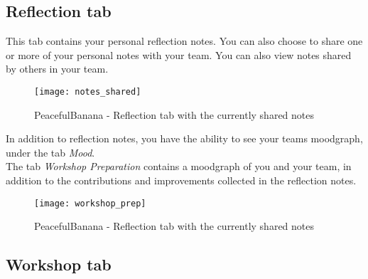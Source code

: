 \subsection{Reflection tab}
This tab contains your personal reflection notes. You can also choose to share one or more of your personal notes with your team. You can also view notes shared by others in your team. \\
\begin{figure}[h!]
\label{milestonessingular}
\centering
	\texttt{[image: notes\_shared]}
\caption{PeacefulBanana - Reflection tab with the currently shared notes}
\end{figure}
In addition to reflection notes, you have the ability to see your teams moodgraph, under the tab \textit{Mood}. \\
The tab \textit{Workshop Preparation} contains a moodgraph of you and your team, in addition to the contributions and improvements collected in the reflection notes. \\
\begin{figure}[h!]
\label{milestonessingular}
\centering
	\texttt{[image: workshop\_prep]}
\caption{PeacefulBanana - Reflection tab with the currently shared notes}
\end{figure}

%
%

\subsection{Workshop tab}



